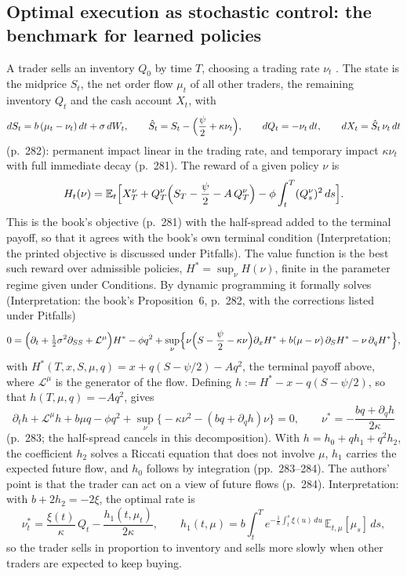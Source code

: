 \subsection{Optimal execution as stochastic control: the benchmark for learned policies}

\begin{qfmodel}\label{mod:cartea-jaimungal-execution}
 A trader sells an inventory $Q_0$ by time $T$, choosing a trading rate $\nu_t$ \citep[app.~A, sec.~A.7.3, pp.~281--282]{alpha-laruelle}. The state is the midprice $S_t$, the net order flow $\mu_t$ of all other traders, the remaining inventory $Q_t$ and the cash account $X_t$, with
\[ dS_t=b\,(\mu_t-\nu_t)\,dt+\sigma\,dW_t,\qquad \hat S_t=S_t-\Bigl(\frac\psi2+\kappa\nu_t\Bigr),\qquad dQ_t=-\nu_t\,dt,\qquad dX_t=\hat S_t\,\nu_t\,dt \]
(p.~282): permanent impact linear in the trading rate, and temporary impact $\kappa\nu_t$ with full immediate decay (p.~281). The reward of a given policy $\nu$ is
\[ H_t(\nu)=\mathbb E_t\Bigl[X_T^\nu+Q_T^\nu\Bigl(S_T-\frac\psi2-A\,Q_T^\nu\Bigr)-\phi\int_t^T(Q_s^\nu)^2\,ds\Bigr]. \]
This is the book's objective (p.~281) with the half-spread added to the terminal payoff, so that it agrees with the book's own terminal condition (Interpretation; the printed objective is discussed under Pitfalls). The value function is the best such reward over admissible policies, $H^*=\sup_\nu H(\nu)$, finite in the parameter regime given under Conditions. By dynamic programming it formally solves (Interpretation: the book's Proposition~6, p.~282, with the corrections listed under Pitfalls)
\[ 0=\Bigl(\partial_t+\tfrac12\sigma^2\partial_{SS}+\mathcal L^\mu\Bigr)H^*-\phi q^2+\sup_\nu\Bigl\{\nu\Bigl(S-\frac\psi2-\kappa\nu\Bigr)\partial_xH^*+b(\mu-\nu)\,\partial_SH^*-\nu\,\partial_qH^*\Bigr\}, \]
with $H^*(T,x,S,\mu,q)=x+q(S-\psi/2)-Aq^2$, the terminal payoff above, where $\mathcal L^\mu$ is the generator of the flow. Defining $h:=H^*-x-q(S-\psi/2)$, so that $h(T,\mu,q)=-Aq^2$, gives
\[ \partial_th+\mathcal L^\mu h+b\mu q-\phi q^2+\sup_\nu\bigl\{-\kappa\nu^2-(bq+\partial_qh)\nu\bigr\}=0,\qquad \nu^*=-\frac{bq+\partial_qh}{2\kappa} \]
(p.~283; the half-spread cancels in this decomposition). With $h=h_0+qh_1+q^2h_2$, the coefficient $h_2$ solves a Riccati equation that does not involve $\mu$, $h_1$ carries the expected future flow, and $h_0$ follows by integration (pp.~283--284). The authors' point is that the trader can act on a view of future flows (p.~284). Interpretation: with $b+2h_2=-2\xi$, the optimal rate is
\[ \nu_t^*=\frac{\xi(t)}{\kappa}\,Q_t-\frac{h_1(t,\mu_t)}{2\kappa},\qquad h_1(t,\mu)=b\int_t^Te^{-\frac1\kappa\int_t^s\xi(u)\,du}\,\mathbb E_{t,\mu}[\mu_s]\,ds, \]
so the trader sells in proportion to inventory and sells more slowly when other traders are expected to keep buying.


\end{qfmodel}
